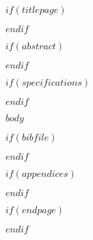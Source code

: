 \documentclass[
    a4paper,
    11pt,
    $for(classoption)$$classoption$,$endfor$
    onecolumn,
    titlepage,
    openany,
    french,
]{$if(documentclass)$$documentclass$$else$report$endif$}
\begin{document}

    $if(titlepage)$
    \label{titlepage}
    
    \cleardoublepage
    $endif$


    $if(abstract)$
    \begin{abstract}
        \thispagestyle{plain}
        
    \end{abstract}
    \cleardoublepage
    $endif$



    $if(specifications)$
        
        \cleardoublepage
    $endif$



    \sffamily
    \label{tableofcontents}
    \setcounter{tocdepth}{2}
    \tableofcontents
    \normalfont

    \cleardoublepage




    $body$



    $if(bibfile)$
        
        
    $endif$


    $if(appendices)$
        \clearpage
        \begin{appendices}
        \end{appendices}
    $endif$


    $if(endpage)$
        \newpage
        \thispagestyle{empty}
        
    $endif$
\end{document}
